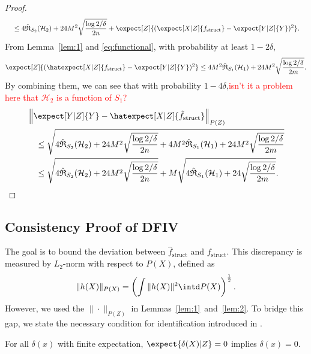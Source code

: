 \begin{proof}
\begin{align*}
    &\quad \leq 4\hat{\mathfrak{R}}_{S_2}(\mathcal{H}_2) + 24M^2\sqrt{\frac{\log 2/\delta}{2n}}+ \expect[Z]{(\expect[X|Z]{{f}_{\mathrm{struct}}} - \expect[Y|Z]{Y})^2}.
\end{align*}
From Lemma~\ref{lem:1} and \eqref{eq:functional}, with probability at least $1-2\delta$,
\begin{align*}
    \expect[Z]{(\hatexpect[X|Z]{{f}_{\mathrm{struct}}} - \expect[Y|Z]{Y})^2} \leq 4M^2\hat{\mathfrak{R}}_{S_1}(\mathcal{H}_1) + 24M^2 \sqrt{\frac{\log 2/\delta}{2m}}.
\end{align*}
By combining them, we can see that with probability $1-4\delta$,\textcolor{red}{isn't it a problem here that $\mathcal{H}_2$ is a function of $S_1$?}
\begin{align*}
    &\left\|\expect[Y|Z]{Y} - \hatexpect[X|Z]{\hat{f}_{\mathrm{struct}}}\right\|_{P(Z)} \\
    &\quad \leq \sqrt{4\hat{\mathfrak{R}}_{S_2}(\mathcal{H}_2) + 24M^2\sqrt{\frac{\log 2/\delta}{2n}} + 4M^2\hat{\mathfrak{R}}_{S_1}(\mathcal{H}_1) + 24M^2 \sqrt{\frac{\log 2/\delta}{2m}}}\\
    &\quad \leq \sqrt{4\hat{\mathfrak{R}}_{S_2}(\mathcal{H}_2) + 24M^2\sqrt{\frac{\log 2/\delta}{2n}}} + M\sqrt{4\hat{\mathfrak{R}}_{S_1}(\mathcal{H}_1) + 24 \sqrt{\frac{\log 2/\delta}{2m}}}.
\end{align*}
\end{proof}

 \subsection{Consistency Proof of DFIV}
 The goal is to bound the deviation between $\hat{f}_{\mathrm{struct}}$ and $f_{\mathrm{struct}}$. This discrepancy is measured by $L_2$-norm with respect to $P(X)$, defined as
 \begin{align*}
     \|h(X)\|_{P(X)} =  \left(\int \|h(X)\|^2 \intd P(X)\right)^{\frac12}.
 \end{align*}
 However, we used the $\|\cdot\|_{P(Z)}$ in Lemmas~\ref{lem:1}~and~\ref{lem:2}. To bridge this gap, we state  the necessary condition for identification introduced in \citep{Newey2003}.

 \begin{prop}{\citep[Proposition~2.1][]{Newey2003}}\label{prop:identification}
 For all $\delta(x)$ with finite expectation, $\expect{\delta(X)|Z} = 0$ implies $\delta(x) = 0$.
 \end{prop}
 
